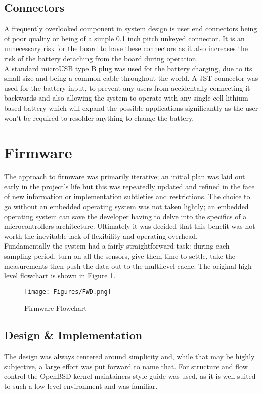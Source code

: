 \documentclass[12pt,openany,a4paper]{book}
\begin{document}
		\subsection{Connectors}
		A frequently overlooked component in system design is user end connectors being of poor quality or being of a simple 0.1 inch pitch unkeyed connector. It is an unnecessary risk for the board to have these connectors as it also increases the risk of the battery detaching from the board during operation.\\
		
		A standard microUSB type B plug was used for the battery charging, due to its small size and being a common cable throughout the world. A JST connector was used for the battery input, to prevent any users from accidentally connecting it backwards and also allowing the system to operate with any single cell lithium based battery which will expand the possible applications significantly as the user won't be required to resolder anything to change the battery. 
		
	\newpage
	\section{Firmware}
		The approach to firmware was primarily iterative; an initial plan was laid out early in the project's life but this was repeatedly updated and refined in the face of new information or implementation subtleties and restrictions. The choice to go without an embedded operating system was not taken lightly; an embedded operating system can save the developer having to delve into the specifics of a microcontrollers architecture. Ultimately it was decided that this benefit was not worth the inevitable lack of flexibility and operating overhead. \\
		
		Fundamentally the system had a fairly straightforward task: during each sampling period, turn on all the sensors, give them time to settle, take the measurements then push the data out to the multilevel cache. The original high level flowchart is shown in Figure \ref{fig:FWD}.
		
		\begin{figure}[H]
			\centering
			\texttt{[image: Figures/FWD.png]}
			\caption{Firmware Flowchart}
			\label{fig:FWD}
		\end{figure}		

		\newpage
		\subsection{Design \& Implementation} %
		The design was always centered around simplicity and, while that may be highly subjective, a large effort was put forward to name that. For structure and flow control the OpenBSD kernel maintainers style guide \cite{BSDstyle} was used, as it is well suited to such a low level environment and was familiar. \\
		
\end{document}
